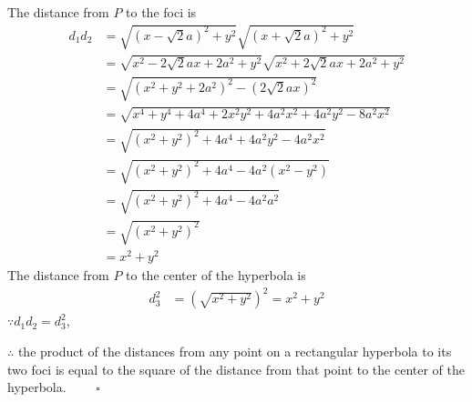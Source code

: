 \documentclass{report}
\newcommand{\eos}{ \qquad \square}
\begin{document}
\begin{enumerate}[leftmargin=*]
          The distance from $P$ to the foci is
          \begin{align*}
              d_1d_2 & = \sqrt{(x - \sqrt{2}a)^2 + y^2} \sqrt{(x + \sqrt{2}a)^2 + y^2}               \\
                     & = \sqrt{x^2 - 2\sqrt{2}ax + 2a^2 + y^2} \sqrt{x^2 + 2\sqrt{2}ax + 2a^2 + y^2} \\
                     & = \sqrt{(x^2 + y^2 + 2a^2)^2 - (2\sqrt{2}ax)^2}                               \\
                     & = \sqrt{x^4 + y^4 + 4a^4 + 2x^2y^2 + 4a^2x^2 + 4a^2y^2 - 8a^2x^2}             \\
                     & = \sqrt{(x^2 + y^2)^2 + 4a^4 + 4a^2y^2 - 4a^2x^2}                             \\
                     & = \sqrt{(x^2 + y^2)^2 + 4a^4 - 4a^2(x^2 - y^2)}                               \\
                     & = \sqrt{(x^2 + y^2)^2 + 4a^4 - 4a^2a^2}                                       \\
                     & = \sqrt{(x^2 + y^2)^2}                                                        \\
                     & = x^2 + y^2
          \end{align*}
          The distance from $P$ to the center of the hyperbola is
          \begin{align*}
              d_3^2 & = (\sqrt{x^2 + y^2})^2 = x^2 + y^2
          \end{align*}
          $\because d_1d_2 = d_3^2$,

          $\therefore$ the product of the distances from any point on a rectangular hyperbola to its two foci is equal to the square of the distance from that point to the center of the hyperbola. $\eos$

\end{enumerate}
\end{document}
